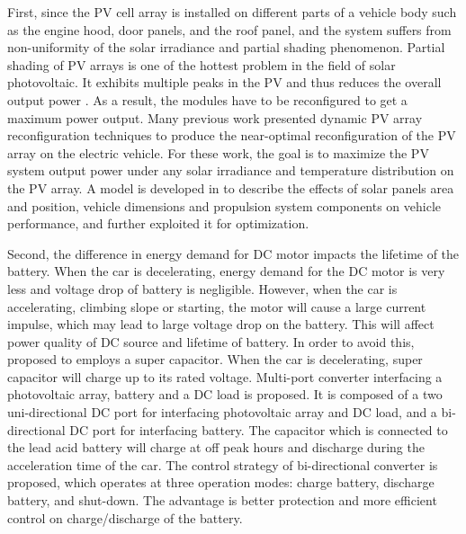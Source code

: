 First, since the PV cell array is installed on different parts of a vehicle body such as the engine hood, door panels, and the roof panel, and the system suffers from non-uniformity of the solar irradiance and partial shading phenomenon.
Partial shading of PV arrays is one of the hottest problem in the field of solar photovoltaic.
It exhibits multiple peaks in the PV and thus reduces the overall output power \cite{JX_rajan2017solar}.
As a result, the modules have to be reconfigured to get a maximum power output.
Many previous work \cite{JX_wang2012dynamic,JX_kim2014fast,JX_storey2014optimized,JX_arsie2006optimal} presented dynamic PV array reconfiguration techniques to produce the near-optimal reconfiguration of the PV array on the electric vehicle.
For these work, the goal is to maximize the PV system output power under any solar irradiance and temperature distribution on the PV array.
A model is developed in \cite{JX_vicente2015photovoltaic} to describe the effects of solar panels area and position, vehicle dimensions and propulsion system components on vehicle performance, and further exploited it for optimization.


Second, the difference in energy demand for DC motor impacts the lifetime of the battery.
When the car is decelerating, energy demand for the DC motor is very less and voltage drop of battery is negligible.
However, when the car is accelerating, climbing slope or starting, the motor will cause a large current impulse, which may lead to large voltage drop on the battery.
This will affect power quality of DC source and lifetime of battery.
In order to avoid this, \cite{JX_vincent2013advanced,JX_hopkins2015high,JX_agrawal2016multi} proposed to employs a super capacitor.
When the car is decelerating, super capacitor will charge up to its rated voltage.
Multi-port converter interfacing a photovoltaic array, battery and a DC load is proposed.
It is composed of a two uni-directional DC port for interfacing photovoltaic array and DC load, and a bi-directional DC port for interfacing battery.
The capacitor which is connected to the lead acid battery will charge at off peak hours and discharge during the acceleration time of the car.
The control strategy of bi-directional converter is proposed, which operates at three operation modes: charge battery, discharge battery, and shut-down.
The advantage is better protection and more efficient control on charge/discharge of the battery.

